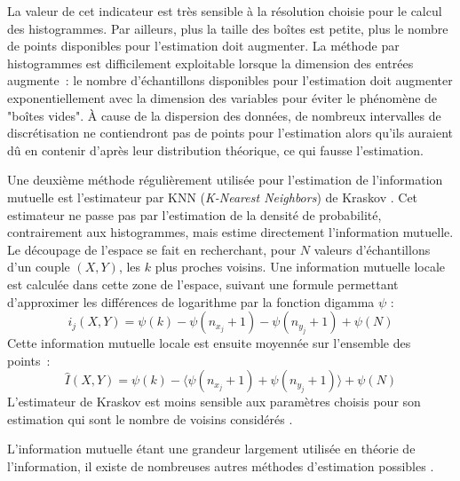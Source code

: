 \documentclass[../main]{subfiles}
\begin{document}
La valeur de cet indicateur est très sensible à la résolution choisie pour le calcul des histogrammes.
Par ailleurs, plus la taille des boîtes est petite, plus le nombre de points disponibles pour l'estimation doit augmenter.
La méthode par histogrammes est difficilement exploitable lorsque la dimension des entrées augmente~:
le nombre d'échantillons disponibles pour l'estimation doit augmenter exponentiellement avec la dimension des variables pour éviter le phénomène de "boîtes vides". \`A cause de la dispersion des données, de nombreux intervalles de discrétisation ne contiendront pas de points pour l'estimation alors qu'ils auraient dû en contenir d'après leur distribution théorique, ce qui fausse l'estimation.

Une deuxième méthode régulièrement utilisée pour l'estimation de l'information mutuelle est l'estimateur par KNN (\emph{K-Nearest Neighbors}) de Kraskov \cite{2004kraskov}.
Cet estimateur ne passe pas par l'estimation de la densité de probabilité, contrairement aux histogrammes, mais estime directement l'information mutuelle.
Le découpage de l'espace se fait en recherchant, pour $N$ valeurs d'échantillons d'un couple $(X,Y)$, les $k$ plus proches voisins. Une information mutuelle locale est calculée dans cette zone de l'espace, suivant une formule permettant d'approximer les différences de logarithme par la fonction digamma $\psi$ : 
$$i_j(X,Y) = \psi(k) - \psi(n_{x_j} + 1) - \psi(n_{y_j} +1) + \psi(N)$$
Cette information mutuelle locale est ensuite moyennée sur l'ensemble des points~: 
$$\hat{I}(X,Y) = \psi(k) - \langle\psi(n_{x_j} + 1) + \psi(n_{y_j} +1)\rangle + \psi(N)$$
L'estimateur de Kraskov est moins sensible aux paramètres choisis pour son estimation qui sont le nombre de voisins considérés \cite{ross_mutual_2014}.

L'information mutuelle étant une grandeur largement utilisée en théorie de l'information, il existe de nombreuses autres méthodes d'estimation possibles \cite{Doquire2012ACO}.
\end{document}
